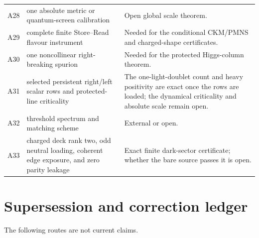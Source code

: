 \documentclass[11pt,oneside,openany]{book}
\numberwithin{equation}{chapter}
\theoremstyle{definition}
\theoremstyle{remark}
\begin{document}
\begin{longtable}{@{}p{}p{}p{}@{}}
A28
& one absolute metric or quantum-screen calibration
& Open global scale theorem.\\
A29
& complete finite Store--Read flavour instrument
& Needed for the conditional CKM/PMNS and charged-shape certificates.\\
A30
& one noncollinear right-breaking spurion
& Needed for the protected Higgs-column theorem.\\
A31
& selected persistent right/left scalar rows and protected-line criticality
& The one-light-doublet count and heavy positivity are exact once the rows are loaded; the dynamical criticality and absolute scale remain open.\\
A32
& threshold spectrum and matching scheme
& External or open.\\
A33
& charged deck rank two, odd neutral loading, coherent edge exposure, and zero parity leakage
& Exact finite dark-sector certificate; whether the bare source passes it is open.\\
\bottomrule
\end{longtable}

\chapter{Supersession and correction ledger}
\label{app:supersession}

The following routes are not current claims.
\end{document}
